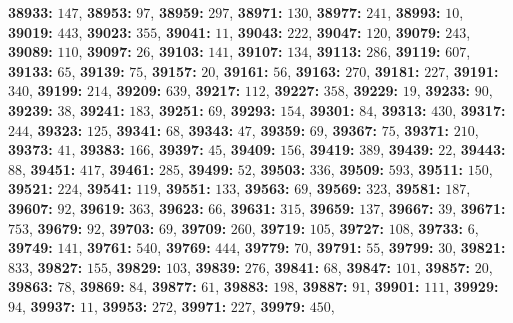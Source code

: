 \textsf{\bfseries 38933:} $147$, \textsf{\bfseries 38953:} $97$, \textsf{\bfseries 38959:} $297$, \textsf{\bfseries 38971:} $130$, \textsf{\bfseries 38977:} $241$, \textsf{\bfseries 38993:} $10$, \textsf{\bfseries 39019:} $443$, \textsf{\bfseries 39023:} $355$, \textsf{\bfseries 39041:} $11$, \textsf{\bfseries 39043:} $222$, \textsf{\bfseries 39047:} $120$, \textsf{\bfseries 39079:} $243$, \textsf{\bfseries 39089:} $110$, \textsf{\bfseries 39097:} $26$, \textsf{\bfseries 39103:} $141$, \textsf{\bfseries 39107:} $134$, \textsf{\bfseries 39113:} $286$, \textsf{\bfseries 39119:} $607$, \textsf{\bfseries 39133:} $65$, \textsf{\bfseries 39139:} $75$, \textsf{\bfseries 39157:} $20$, \textsf{\bfseries 39161:} $56$, \textsf{\bfseries 39163:} $270$, \textsf{\bfseries 39181:} $227$, \textsf{\bfseries 39191:} $340$, \textsf{\bfseries 39199:} $214$, \textsf{\bfseries 39209:} $639$, \textsf{\bfseries 39217:} $112$, \textsf{\bfseries 39227:} $358$, \textsf{\bfseries 39229:} $19$, \textsf{\bfseries 39233:} $90$, \textsf{\bfseries 39239:} $38$, \textsf{\bfseries 39241:} $183$, \textsf{\bfseries 39251:} $69$, \textsf{\bfseries 39293:} $154$, \textsf{\bfseries 39301:} $84$, \textsf{\bfseries 39313:} $430$, \textsf{\bfseries 39317:} $244$, \textsf{\bfseries 39323:} $125$, \textsf{\bfseries 39341:} $68$, \textsf{\bfseries 39343:} $47$, \textsf{\bfseries 39359:} $69$, \textsf{\bfseries 39367:} $75$, \textsf{\bfseries 39371:} $210$, \textsf{\bfseries 39373:} $41$, \textsf{\bfseries 39383:} $166$, \textsf{\bfseries 39397:} $45$, \textsf{\bfseries 39409:} $156$, \textsf{\bfseries 39419:} $389$, \textsf{\bfseries 39439:} $22$, \textsf{\bfseries 39443:} $88$, \textsf{\bfseries 39451:} $417$, \textsf{\bfseries 39461:} $285$, \textsf{\bfseries 39499:} $52$, \textsf{\bfseries 39503:} $336$, \textsf{\bfseries 39509:} $593$, \textsf{\bfseries 39511:} $150$, \textsf{\bfseries 39521:} $224$, \textsf{\bfseries 39541:} $119$, \textsf{\bfseries 39551:} $133$, \textsf{\bfseries 39563:} $69$, \textsf{\bfseries 39569:} $323$, \textsf{\bfseries 39581:} $187$, \textsf{\bfseries 39607:} $92$, \textsf{\bfseries 39619:} $363$, \textsf{\bfseries 39623:} $66$, \textsf{\bfseries 39631:} $315$, \textsf{\bfseries 39659:} $137$, \textsf{\bfseries 39667:} $39$, \textsf{\bfseries 39671:} $753$, \textsf{\bfseries 39679:} $92$, \textsf{\bfseries 39703:} $69$, \textsf{\bfseries 39709:} $260$, \textsf{\bfseries 39719:} $105$, \textsf{\bfseries 39727:} $108$, \textsf{\bfseries 39733:} $6$, \textsf{\bfseries 39749:} $141$, \textsf{\bfseries 39761:} $540$, \textsf{\bfseries 39769:} $444$, \textsf{\bfseries 39779:} $70$, \textsf{\bfseries 39791:} $55$, \textsf{\bfseries 39799:} $30$, \textsf{\bfseries 39821:} $833$, \textsf{\bfseries 39827:} $155$, \textsf{\bfseries 39829:} $103$, \textsf{\bfseries 39839:} $276$, \textsf{\bfseries 39841:} $68$, \textsf{\bfseries 39847:} $101$, \textsf{\bfseries 39857:} $20$, \textsf{\bfseries 39863:} $78$, \textsf{\bfseries 39869:} $84$, \textsf{\bfseries 39877:} $61$, \textsf{\bfseries 39883:} $198$, \textsf{\bfseries 39887:} $91$, \textsf{\bfseries 39901:} $111$, \textsf{\bfseries 39929:} $94$, \textsf{\bfseries 39937:} $11$, \textsf{\bfseries 39953:} $272$, \textsf{\bfseries 39971:} $227$, \textsf{\bfseries 39979:} $450$, 
